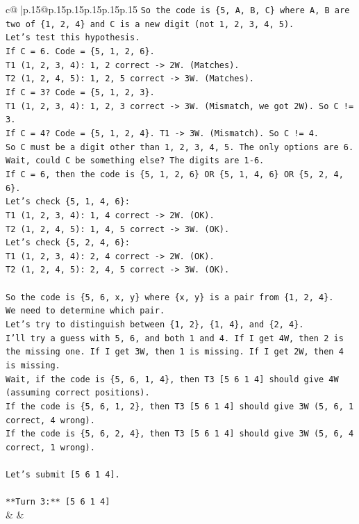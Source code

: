 \documentclass{article}
\begin{document}
{\begin{supertabular}{c@{$\;$}|p{.15\linewidth}@{}p{.15\linewidth}p{.15\linewidth}p{.15\linewidth}p{.15\linewidth}p{.15\linewidth}}
{{{\texttt{So the code is \{5, A, B, C\} where A, B are two of \{1, 2, 4\} and C is a new digit (not 1, 2, 3, 4, 5).} \\
\texttt{Let's test this hypothesis.} \\
\texttt{If C = 6. Code = \{5, 1, 2, 6\}.} \\
\texttt{T1 (1, 2, 3, 4): 1, 2 correct {-}> 2W. (Matches).} \\
\texttt{T2 (1, 2, 4, 5): 1, 2, 5 correct {-}> 3W. (Matches).} \\
\texttt{If C = 3? Code = \{5, 1, 2, 3\}.} \\
\texttt{T1 (1, 2, 3, 4): 1, 2, 3 correct {-}> 3W. (Mismatch, we got 2W). So C != 3.} \\
\texttt{If C = 4? Code = \{5, 1, 2, 4\}. T1 {-}> 3W. (Mismatch). So C != 4.} \\
\texttt{So C must be a digit other than 1, 2, 3, 4, 5. The only options are 6.} \\
\texttt{Wait, could C be something else? The digits are 1{-}6.} \\
\texttt{If C = 6, then the code is \{5, 1, 2, 6\} OR \{5, 1, 4, 6\} OR \{5, 2, 4, 6\}.} \\
\texttt{Let's check \{5, 1, 4, 6\}:} \\
\texttt{T1 (1, 2, 3, 4): 1, 4 correct {-}> 2W. (OK).} \\
\texttt{T2 (1, 2, 4, 5): 1, 4, 5 correct {-}> 3W. (OK).} \\
\texttt{Let's check \{5, 2, 4, 6\}:} \\
\texttt{T1 (1, 2, 3, 4): 2, 4 correct {-}> 2W. (OK).} \\
\texttt{T2 (1, 2, 4, 5): 2, 4, 5 correct {-}> 3W. (OK).} \\
\\ 
\texttt{So the code is \{5, 6, x, y\} where \{x, y\} is a pair from \{1, 2, 4\}.} \\
\texttt{We need to determine which pair.} \\
\texttt{Let's try to distinguish between \{1, 2\}, \{1, 4\}, and \{2, 4\}.} \\
\texttt{I'll try a guess with 5, 6, and both 1 and 4. If I get 4W, then 2 is the missing one. If I get 3W, then 1 is missing. If I get 2W, then 4 is missing.} \\
\texttt{Wait, if the code is \{5, 6, 1, 4\}, then T3 {[}5 6 1 4{]} should give 4W (assuming correct positions).} \\
\texttt{If the code is \{5, 6, 1, 2\}, then T3 {[}5 6 1 4{]} should give 3W (5, 6, 1 correct, 4 wrong).} \\
\texttt{If the code is \{5, 6, 2, 4\}, then T3 {[}5 6 1 4{]} should give 3W (5, 6, 4 correct, 1 wrong).} \\
\\ 
\texttt{Let's submit {[}5 6 1 4{]}.} \\
\\ 
\texttt{**Turn 3:** {[}5 6 1 4{]}} \\
            }
        }
    }
    & & \\ \\


\end{supertabular}}
\end{document}
